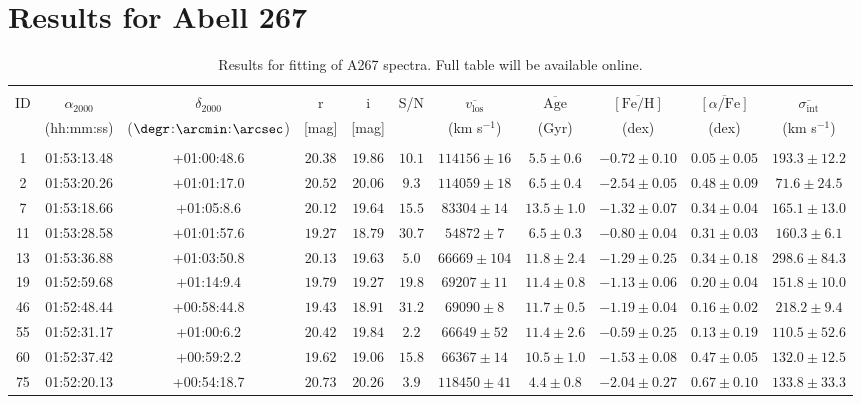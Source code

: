 \documentclass[twocolumn]{aastex6}
\def\feh{\mathrm{[Fe/H]}}
\def\afe{[\alpha/\mathrm{Fe}]}
\def\age{\mathrm{Age}}
\def\vlos{v_\mathrm{los}}
\def\disp{\sigma_\mathrm{int}}
\begin{document}
\section{Results for Abell 267}
\label{results}

\begin{table*}
\caption{Results for fitting of A267 spectra. Full table will be available online.}
\label{A267Results}
\begin{tabular}{ c c c c c c c c c c c }
\hline
\hline\\
ID & $\alpha_{2000}$ & $\delta_{2000}$ & r & i & S/N & $\overline{\vlos}$ & $\overline{\age}$ & $\overline{\feh}$ & $\overline{\afe}$ & $\overline{\disp}$\\
& (hh:mm:ss) & ($\degr$:$\arcmin$:$\arcsec$) & [mag] & [mag] & & (km s$^{-1}$) & (Gyr) & (dex) & (dex) & (km s$^{-1}$)\\\\
\hline
1 & 01:53:13.48 & +01:00:48.6 & $20.38$ & $19.86$ & $10.1$ & $114156\pm16$ & $5.5\pm0.6$ & $-0.72\pm0.10$ & $0.05\pm0.05$ & $193.3\pm12.2$\\
2 & 01:53:20.26 & +01:01:17.0 & $20.52$ & $20.06$ & $9.3$ & $114059\pm18$ & $6.5\pm0.4$ & $-2.54\pm0.05$ & $0.48\pm0.09$ & $71.6\pm24.5$\\
7 & 01:53:18.66 & +01:05:8.6 & $20.12$ & $19.64$ & $15.5$ & $83304\pm14$ & $13.5\pm1.0$ & $-1.32\pm0.07$ & $0.34\pm0.04$ & $165.1\pm13.0$\\
11 & 01:53:28.58 & +01:01:57.6 & $19.27$ & $18.79$ & $30.7$ & $54872\pm7$ & $6.5\pm0.3$ & $-0.80\pm0.04$ & $0.31\pm0.03$ & $160.3\pm6.1$\\
13 & 01:53:36.88 & +01:03:50.8 & $20.13$ & $19.63$ & $5.0$ & $66669\pm104$ & $11.8\pm2.4$ & $-1.29\pm0.25$ & $0.34\pm0.18$ & $298.6\pm84.3$\\
19 & 01:52:59.68 & +01:14:9.4 & $19.79$ & $19.27$ & $19.8$ & $69207\pm11$ & $11.4\pm0.8$ & $-1.13\pm0.06$ & $0.20\pm0.04$ & $151.8\pm10.0$\\
46 & 01:52:48.44 & +00:58:44.8 & $19.43$ & $18.91$ & $31.2$ & $69090\pm8$ & $11.7\pm0.5$ & $-1.19\pm0.04$ & $0.16\pm0.02$ & $218.2\pm9.4$\\
55 & 01:52:31.17 & +01:00:6.2 & $20.42$ & $19.84$ & $2.2$ & $66649\pm52$ & $11.4\pm2.6$ & $-0.59\pm0.25$ & $0.13\pm0.19$ & $110.5\pm52.6$\\
60 & 01:52:37.42 & +00:59:2.2 & $19.62$ & $19.06$ & $15.8$ & $66367\pm14$ & $10.5\pm1.0$ & $-1.53\pm0.08$ & $0.47\pm0.05$ & $132.0\pm12.5$\\
75 & 01:52:20.13 & +00:54:18.7 & $20.73$ & $20.26$ & $3.9$ & $118450\pm41$ & $4.4\pm0.8$ & $-2.04\pm0.27$ & $0.67\pm0.10$ & $133.8\pm33.3$\\
\hline\hline\end{tabular}\end{table*}
\end{document}
